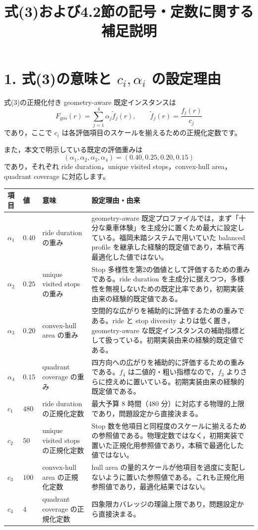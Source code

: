 \documentclass[a4paper,11pt]{article}
\begin{document}
\sloppy

\title{式(3)および4.2節の記号・定数に関する補足説明}
\section*{1. 式(3)の意味と $c_i,\alpha_i$ の設定理由}

式(3)の正規化付き geometry-aware 既定インスタンスは
\[
F_{\mathrm{geo}}(r)=\sum_{j=1}^{4}\alpha_j \tilde{f}_j(r),
\qquad
\tilde{f}_j(r)=\frac{f_j(r)}{c_j}
\]
であり，ここで $c_i$ は各評価項目のスケールを揃えるための正規化定数です。

また，本文で明示している既定の評価重みは
\[
(\alpha_1,\alpha_2,\alpha_3,\alpha_4)=(0.40,0.25,0.20,0.15)
\]
であり，それぞれ ride duration，unique visited stops，convex-hull area，quadrant coverage に対応します。

\begin{tabularx}{\linewidth}{L{2.2cm}L{2.3cm}L{3.8cm}X}
\toprule
項目 & 値 & 意味 & 設定理由・由来 \\
\midrule
$\alpha_1$ & $0.40$ & ride duration の重み & geometry-aware 既定プロファイルでは，まず「十分な乗車体験」を主成分に置くため最大に設定している。福岡未踏システムで用いていた balanced profile を継承した経験的既定値であり，本稿で再最適化した値ではない。 \\
$\alpha_2$ & $0.25$ & unique visited stops の重み & Stop 多様性を第2の価値として評価するための重みである。ride duration を主成分に据えつつ，多様性を無視しないための既定比率であり，初期実装由来の経験的既定値である。 \\
$\alpha_3$ & $0.20$ & convex-hull area の重み & 空間的な広がりを補助的に評価するための重みである。ride と stop diversity よりは低く置き，geometry-aware な既定インスタンスの補助指標として扱っている。初期実装由来の経験的既定値である。 \\
$\alpha_4$ & $0.15$ & quadrant coverage の重み & 四方向への広がりを補助的に評価するための重みである。$f_4$ は二値的・粗い指標なので，$f_3$ よりさらに控えめに置いている。初期実装由来の経験的既定値である。 \\
$c_1$ & $480$ & ride duration の正規化定数 & 最大予算 8 時間（480 分）に対応する物理的上限であり，問題設定から直接決まる。 \\
$c_2$ & $50$ & unique visited stops の正規化定数 & Stop 数を他項目と同程度のスケールに揃えるための参照値である。物理定数ではなく，初期実装で置いた正規化用参照値であり，本稿で最適化した値ではない。 \\
$c_3$ & $100$ & convex-hull area の正規化定数 & hull area の量的スケールが他項目を過度に支配しないように置いた参照値である。これも正規化用参照値であり，最適化結果ではない。 \\
$c_4$ & $4$ & quadrant coverage の正規化定数 & 四象限カバレッジの理論上限であり，問題設定から直接決まる。 \\
\bottomrule
\end{tabularx}
\end{document}

